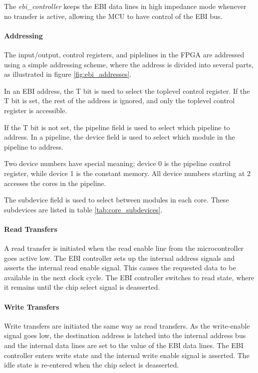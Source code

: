 The \emph{ebi_controller} keeps the EBI data lines in high impedance mode
whenever no transfer is active, allowing the MCU to have control of the EBI bus.



\FloatBarrier
\paragraph{Addressing}

The input/output, control registers, and piplelines in the FPGA are addressed
using a simple addressing scheme, where the address is divided into several
parts, as illustrated in figure \ref{fig:ebi_addresses}.



In an EBI address, the T bit is used to select the toplevel control register.
If the T bit is set, the rest of the address is ignored, and only the toplevel
control register is accessible.

If the T bit is not set, the pipeline field is used to select which pipeline to
address. In a pipeline, the device field is used to select which module in the
pipeline to address.

Two device numbers have special meaning; device 0 is the pipeline control
register, while device 1 is the constant memory. All device numbers starting at
2 accesses the cores in the pipeline.

The subdevice field is used to select between modules in each core. These
subdevices are listed in table \ref{tab:core_subdevices}.



\FloatBarrier
\paragraph{Read Transfers}

A read transfer is initiated when the read enable line from the microcontroller
goes active low. The EBI controller sets up the internal address signals and
asserts the internal read enable signal. This causes the requested data to be
available in the next clock cycle. The EBI controller switches to read state,
where it remains until the chip select signal is deasserted.

\paragraph{Write Transfers}

Write transfers are initiated the same way as read transfers. As the
write-enable signal goes low, the destination address is latched into the
internal address bus and the internal data lines are set to the value of the EBI
data lines. The EBI controller enters write state and the internal write enable
signal is asserted. The idle state is re-entered when the chip select is
deasserted.
